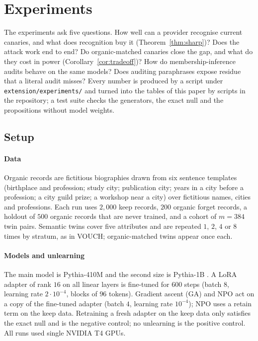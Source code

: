 \section{Experiments}\label{sec:experiments}

The experiments ask five questions. How well can a provider recognise current canaries, and
what does recognition buy it (Theorem~\ref{thm:sharp})? Does the attack work end to end? Do organic-matched canaries close the
gap, and what do they cost in power (Corollary~\ref{cor:tradeoff})? How do
membership-inference audits behave on the same models? Does auditing paraphrases expose
residue that a literal audit misses? Every number is produced by a script under
\texttt{extension/experiments/} and turned into the tables of this paper by scripts in the
repository; a test suite checks the generators, the exact null and the propositions without
model weights.

\subsection{Setup}\label{sec:exp-setup}

\paragraph{Data} Organic records are fictitious biographies drawn from six sentence templates
(birthplace and profession; study city; publication city; years in a city before a
profession; a city guild prize; a workshop near a city) over fictitious names, cities and
professions. Each run uses $2{,}000$ keep records, $200$ organic forget records, a holdout of
$500$ organic records that are never trained, and a cohort of $m=384$ twin pairs. Semantic
twins cover five attributes and are repeated $1$, $2$, $4$ or $8$ times by stratum, as in
VOUCH; organic-matched twins appear once each.

\paragraph{Models and unlearning} The main model is Pythia-410M and the second size is
Pythia-1B \citep{biderman2023pythia}. A LoRA adapter \citep{hu2022lora} of rank $16$ on all
linear layers is fine-tuned for $600$ steps (batch $8$, learning rate $2\cdot10^{-4}$, blocks
of $96$ tokens). Gradient ascent (GA) and NPO \citep{zhang2024npo} act on a copy of the
fine-tuned adapter (batch $4$, learning rate $10^{-4}$); NPO uses a retain term on the keep
data. Retraining a fresh adapter on the keep data only satisfies the exact null and is the
negative control; no unlearning is the positive control. All runs used single NVIDIA T4 GPUs.

